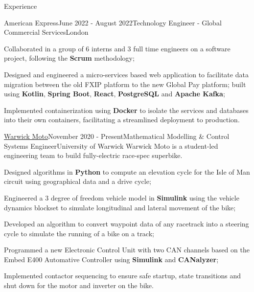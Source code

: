 \documentclass{resume}
\begin{document}
    \begin{rSection}{Experience}
        \begin{rSubsection}{American Express}{June 2022 - August 2022}{Technology Engineer - Global Commercial Services}{London}{}
            \item Collaborated in a group of 6 interns and 3 full time engineers on a software project, following the \textbf{Scrum} methodology;
            \item Designed and engineered a micro-services based web application to facilitate data migration between the old FXIP platform to the new Global Pay platform; built using \textbf{Kotlin}, \textbf{Spring Boot}, \textbf{React}, \textbf{PostgreSQL} and \textbf{Apache Kafka};
            \item Implemented containerization using \textbf{Docker} to isolate the services and databases into their own containers, facilitating a streamlined deployment to production.
        \end{rSubsection}

        \begin{rSubsection}{{\href{https://warwick.ac.uk/fac/sci/wmg/education/undergraduate/student-projects/warwick-moto/}{Warwick Moto}}}{November 2020 - Present}{Mathematical Modelling \& Control Systems Engineer}{University of Warwick}
    {Warwick Moto is a student-led engineering team to build fully-electric race-spec superbike.}
            \item Designed algorithms in \textbf{Python} to compute an elevation cycle for the Isle of Man circuit using geographical data and a drive cycle;
            \item Engineered a 3 degree of freedom vehicle model in \textbf{Simulink} using the vehicle dynamics blockset to simulate longitudinal and lateral movement of the bike;
            \item Developed an algorithm to convert waypoint data of any racetrack into a steering cycle to simulate the running of a bike on a track;
            \item Programmed a new Electronic Control Unit with two CAN channels based on the Embed E400 Automative Controller using \textbf{Simulink} and \textbf{CANalyzer};
            \item Implemented contactor sequencing to ensure safe startup, state transitions and shut down for the motor and inverter on the bike.       
        \end{rSubsection}


\end{rSection}
\end{document}
